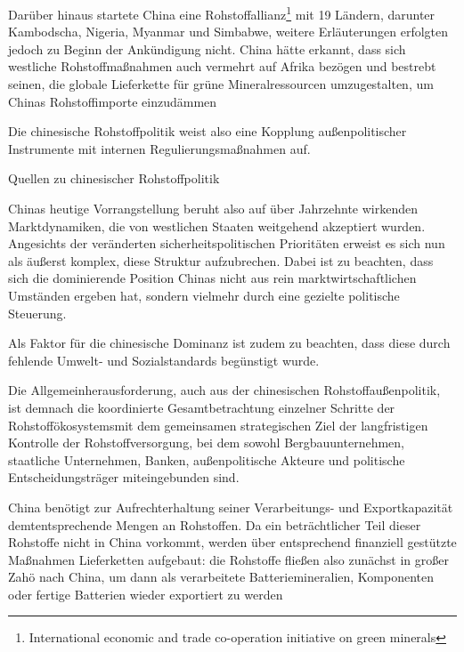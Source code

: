 \documentclass[12pt,a4paper,oneside]{book} %
\begin{document}
{Darüber hinaus startete China eine Rohstoffallianz\footnote{International economic and trade co-operation initiative on green minerals} mit 19 Ländern, darunter Kambodscha, Nigeria, Myanmar und Simbabwe, weitere Erläuterungen erfolgten jedoch zu Beginn der Ankündigung nicht. China hätte erkannt, dass sich westliche Rohstoffmaßnahmen auch vermehrt auf Afrika bezögen und bestrebt seinen, die \glqq globale Lieferkette für grüne Mineralressourcen umzugestalten, um Chinas Rohstoffimporte einzudämmen\grqq

Die chinesische Rohstoffpolitik weist also eine Kopplung außenpolitischer Instrumente mit internen Regulierungsmaßnahmen auf. 

Quellen zu chinesischer Rohstoffpolitik

Chinas heutige Vorrangstellung beruht also auf über Jahrzehnte wirkenden Marktdynamiken, die von westlichen Staaten weitgehend akzeptiert wurden. Angesichts der veränderten sicherheitspolitischen Prioritäten erweist es sich nun als äußerst komplex, diese Struktur aufzubrechen. Dabei ist zu beachten, dass sich die dominierende Position Chinas nicht aus rein marktwirtschaftlichen Umständen ergeben hat, sondern vielmehr durch eine gezielte politische Steuerung.

Als Faktor für die chinesische Dominanz ist zudem zu beachten, dass diese durch fehlende Umwelt- und Sozialstandards begünstigt wurde.

Die Allgemeinherausforderung, auch aus der chinesischen Rohstoffaußenpolitik, ist demnach die koordinierte Gesamtbetrachtung einzelner Schritte der Rohstoffökosystemsmit dem gemeinsamen strategischen Ziel der langfristigen Kontrolle der Rohstoffversorgung, bei dem sowohl Bergbauunternehmen, staatliche Unternehmen, Banken, außenpolitische Akteure und politische Entscheidungsträger miteingebunden sind.\autocite{CSIS: Why the West Keeps Losing Critical Mineral Assets to China}

China benötigt zur Aufrechterhaltung seiner Verarbeitungs- und Exportkapazität demtentsprechende Mengen an Rohstoffen. Da ein beträchtlicher Teil dieser Rohstoffe nicht in China vorkommt, werden über entsprechend finanziell gestützte Maßnahmen Lieferketten aufgebaut: die Rohstoffe fließen also zunächst in großer Zahö nach China, um dann als verarbeitete Batteriemineralien, Komponenten oder fertige Batterien wieder exportiert zu werden

}
\end{document}
